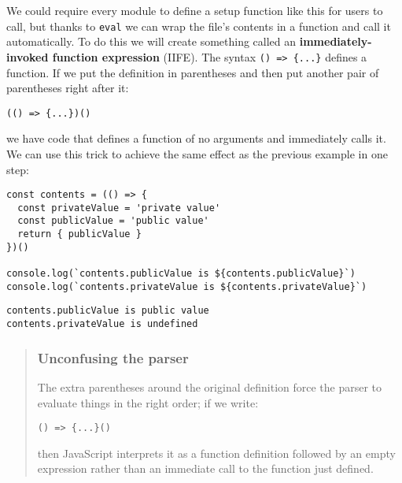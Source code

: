 \documentclass[krantzl]{krantz}
\newcommand{\glossref}[1]{\textbf{#1}}
\newenvironment{callout}{\savenotes\begin{tBox}\begin{quotation}\toggletrue{inbox}\renewcommand{\thempfootnote}{\arabic{footnote}}}{\end{quotation}\vspace{\baselineskip}\end{tBox}\togglefalse{inbox}\spewnotes}
\begin{document}
We could require every module to define a setup function like this for users to call,
but thanks to \texttt{eval} we can wrap the file’s contents in a function and call it automatically.
To do this we will create something called
an \glossref{immediately-invoked function expression} (IIFE).
The syntax \texttt{() => \{...\}} defines a function.
If we put the definition in parentheses and then put another pair of parentheses right after it:

\begin{lstlisting}[frame=tblr]
(() => {...})()
\end{lstlisting}


\noindent we have code that defines a function of no arguments and immediately calls it.
We can use this trick to achieve the same effect as the previous example in one step:


\begin{lstlisting}[frame=tblr]
const contents = (() => {
  const privateValue = 'private value'
  const publicValue = 'public value'
  return { publicValue }
})()

console.log(`contents.publicValue is ${contents.publicValue}`)
console.log(`contents.privateValue is ${contents.privateValue}`)
\end{lstlisting}



\begin{lstlisting}[frame=tblr,backgroundcolor=\color{black!5}]
contents.publicValue is public value
contents.privateValue is undefined
\end{lstlisting}


\begin{callout}


\subsubsection*{Unconfusing the parser}


The extra parentheses around the original definition force the parser to evaluate things in the right order;
if we write:

\begin{lstlisting}[frame=tblr]
() => {...}()
\end{lstlisting}


\noindent then JavaScript interprets it as a function definition followed by an empty expression
rather than an immediate call to the function just defined.

\end{callout}
\end{document}

